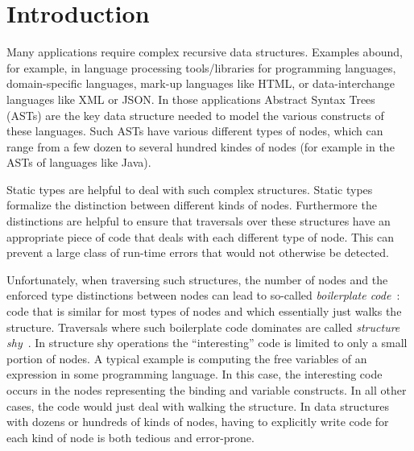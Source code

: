 \section{Introduction}

Many applications require complex recursive data structures. Examples
abound, for example, in language processing tools/libraries for programming
languages, domain-specific languages, mark-up languages like HTML, or
data-interchange languages like XML or JSON. In those applications
Abstract Syntax Trees (ASTs) are the key data structure needed to
model the various constructs of these languages. Such ASTs have various
different types of nodes, which can range from a few dozen to
several hundred kindes of nodes (for example in the ASTs of languages like Java).

Static types are helpful to deal with such complex structures.  Static types formalize the distinction between different kinds of
nodes. Furthermore the distinctions are helpful to ensure that
traversals over these structures have an appropriate piece of code that
deals with each different type of node. This can prevent a large class
of run-time errors that would not otherwise be detected.


Unfortunately, when traversing such structures, the number of nodes and the
enforced type distinctions between nodes can lead to so-called
\emph{boilerplate code}~\cite{ralf03syb}: code that is similar for most types of nodes and which
essentially just walks the structure. Traversals where such boilerplate
code dominates are called \emph{structure shy}~\cite{DemeterBook}. In
structure shy operations the ``interesting'' code is limited to only a small portion of nodes.
A typical example is computing the free
variables of an expression in some programming language. In this
case, the interesting code occurs in the nodes representing the
binding and variable constructs. In all other cases, the code would just deal with
walking the structure. In data structures with dozens or hundreds of
kinds of nodes, having to explicitly write code for each kind of node is both tedious and error-prone.

